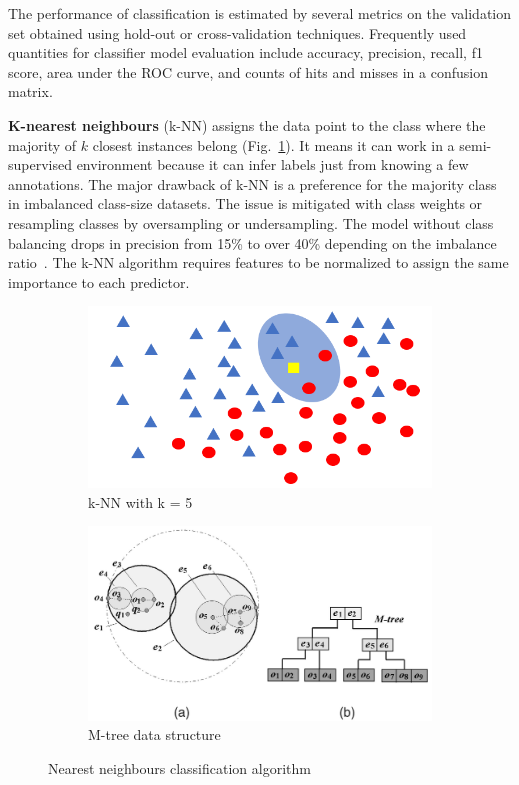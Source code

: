 The performance of classification is estimated by several metrics on the validation set obtained using hold-out or cross-validation techniques. Frequently used quantities for classifier model evaluation include accuracy, precision, recall, f1 score, area under the ROC curve, and counts of hits and misses in a confusion matrix.
\bigbreak

\textbf{K-nearest neighbours} (k-NN) assigns the data point to the class where the majority of $k$ closest instances belong (Fig.~\ref{fig:KNN}). It means it can work in a semi-supervised environment because it can infer labels just from knowing a few annotations. The major drawback of k-NN is a preference for the majority class in imbalanced class-size datasets. The issue is mitigated with class weights or resampling classes by oversampling or undersampling. The model without class balancing drops in precision from 15\% to over 40\% depending on the imbalance ratio~\cite{shi_improving_2020}. The k-NN algorithm requires features to be normalized to assign the same importance to each predictor.

\begin{figure}[ht]
    \centering
    \begin{subfigure}[b]{0.49\textwidth}
        \includegraphics[width=\textwidth]{assets/analysis/KNN.png}
        \caption{k-NN with k = 5}
        \label{fig:KNN}
    \end{subfigure}
    \hfill
    \begin{subfigure}[b]{0.49\textwidth}
        \includegraphics[width=\textwidth]{assets/analysis/M-tree.png}
        \caption{M-tree data structure}
        \label{fig:m-tree}
    \end{subfigure}
    \caption{Nearest neighbours classification algorithm~\cite{chen_skyline_2009}}
\end{figure}

